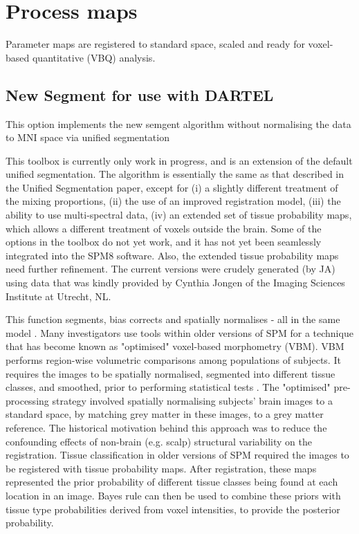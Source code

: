 
\chapter{Process maps  \label{Chap:proc}}

\vskip 1.5cm

Parameter maps are registered to standard space, scaled and ready for voxel-based quantitative (VBQ) analysis.


\section{New Segment for use with DARTEL}
This option implements the new semgent algorithm without normalising the data to MNI space via unified segmentation

This toolbox is currently only work in progress, and is an extension of the default unified segmentation.  The algorithm is essentially the same as that described in the Unified Segmentation paper, except for (i) a slightly different treatment of the mixing proportions, (ii) the use of an improved registration model, (iii) the ability to use multi-spectral data, (iv) an extended set of tissue probability maps, which allows a different treatment of voxels outside the brain. Some of the options in the toolbox do not yet work, and it has not yet been seamlessly integrated into the SPM8 software.  Also, the extended tissue probability maps need further refinement. The current versions were crudely generated (by JA) using data that was kindly provided by Cynthia Jongen of the Imaging Sciences Institute at Utrecht, NL.



This function segments, bias corrects and spatially normalises - all in the same model \cite{ashburner05}.  Many investigators use tools within older versions of SPM for a technique that has become known as "optimised" voxel-based morphometry (VBM). VBM performs region-wise volumetric comparisons among populations of subjects. It requires the images to be spatially normalised, segmented into different tissue classes, and smoothed, prior to performing statistical tests \cite{wright_vbm,am_vbmreview,ashburner00b,john_should}. The "optimised" pre-processing strategy involved spatially normalising subjects' brain images to a standard space, by matching grey matter in these images, to a grey matter reference.  The historical motivation behind this approach was to reduce the confounding effects of non-brain (e.g. scalp) structural variability on the registration. Tissue classification in older versions of SPM required the images to be registered with tissue probability maps. After registration, these maps represented the prior probability of different tissue classes being found at each location in an image.  Bayes rule can then be used to combine these priors with tissue type probabilities derived from voxel intensities, to provide the posterior probability.



